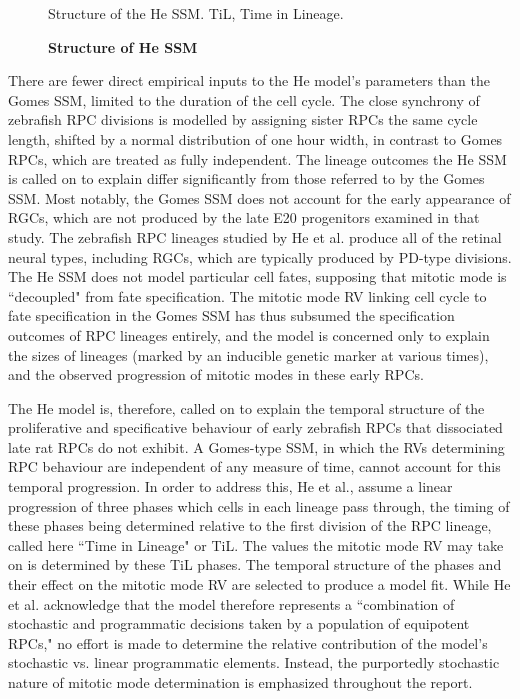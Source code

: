 \begin{figure}[!h]
\caption{{\bf Structure of He SSM}}
Structure of the He SSM. TiL, Time in Lineage.
\label{HeSSM}
\end{figure}

There are fewer direct empirical inputs to the He model's parameters than the Gomes SSM, limited to the duration of the cell cycle. The close synchrony of zebrafish RPC divisions is modelled by assigning sister RPCs the same cycle length, shifted by a normal distribution of one hour width, in contrast to Gomes RPCs, which are treated as fully independent. The lineage outcomes the He SSM is called on to explain differ significantly from those referred to by the Gomes SSM. Most notably, the Gomes SSM does not account for the early appearance of RGCs, which are not produced by the late E20 progenitors examined in that study. The zebrafish RPC lineages studied by He et al. produce all of the retinal neural types, including RGCs, which are typically produced by PD-type divisions. The He SSM does not model particular cell fates, supposing that mitotic mode is ``decoupled" from fate specification. The mitotic mode RV linking cell cycle to fate specification in the Gomes SSM has thus subsumed the specification outcomes of RPC lineages entirely, and the model is concerned only to explain the sizes of lineages (marked by an inducible genetic marker at various times), and the observed progression of mitotic modes in these early RPCs.

The He model is, therefore, called on to explain the temporal structure of the proliferative and specificative behaviour of early zebrafish RPCs that dissociated late rat RPCs do not exhibit. A Gomes-type SSM, in which the RVs determining RPC behaviour are independent of any measure of time, cannot account for this temporal progression. In order to address this, He et al., assume a linear progression of three phases which cells in each lineage pass through, the timing of these phases being determined relative to the first division of the RPC lineage, called here ``Time in Lineage" or TiL. The values the mitotic mode RV may take on is determined by these TiL phases. The temporal structure of the phases and their effect on the mitotic mode RV are selected to produce a model fit. While He et al. acknowledge that the model therefore represents a ``combination of stochastic and programmatic decisions taken by a population of equipotent RPCs," no effort is made to determine the relative contribution of the model's stochastic vs. linear programmatic elements. Instead, the purportedly stochastic nature of mitotic mode determination is emphasized throughout the report.

